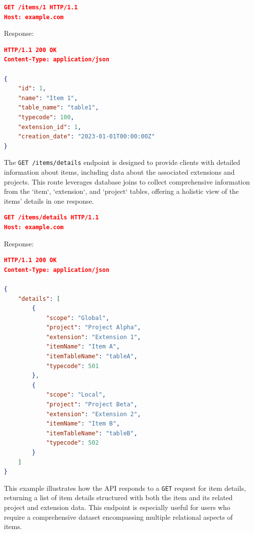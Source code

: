 \begin{lstlisting}[language=json,label={lst:lstlisting9}]
GET /items/1 HTTP/1.1
Host: example.com
\end{lstlisting}

Response:

\begin{lstlisting}[language=json,label={lst:lstlisting10}]
HTTP/1.1 200 OK
Content-Type: application/json

{
    "id": 1,
    "name": "Item 1",
    "table_name": "table1",
    "typecode": 100,
    "extension_id": 1,
    "creation_date": "2023-01-01T00:00:00Z"
}
\end{lstlisting}


The \texttt{GET /items/details} endpoint is designed to provide clients with detailed information about items, including data about the associated extensions and projects. This route leverages database joins to collect comprehensive information from the `item`, `extension`, and `project` tables, offering a holistic view of the items' details in one response.

\begin{lstlisting}[language=json,label={lst:lstlisting5}]
GET /items/details HTTP/1.1
Host: example.com
\end{lstlisting}

Response:

\begin{lstlisting}[language=json,label={lst:lstlisting18}]
HTTP/1.1 200 OK
Content-Type: application/json

{
    "details": [
        {
            "scope": "Global",
            "project": "Project Alpha",
            "extension": "Extension 1",
            "itemName": "Item A",
            "itemTableName": "tableA",
            "typecode": 501
        },
        {
            "scope": "Local",
            "project": "Project Beta",
            "extension": "Extension 2",
            "itemName": "Item B",
            "itemTableName": "tableB",
            "typecode": 502
        }
    ]
}
\end{lstlisting}

This example illustrates how the API responds to a \texttt{GET} request for item details, returning a list of item details structured with both the item and its related project and extension data. This endpoint is especially useful for users who require a comprehensive dataset encompassing multiple relational aspects of items.



